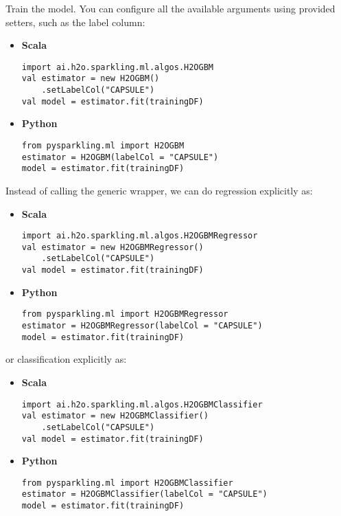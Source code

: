 \documentclass{standalone}
\begin{document}
	Train the model. You can configure all the available arguments using provided setters, such as the label column:

	\begin{itemize}
		\item \textbf{Scala} \begin{lstlisting}[style=Scala]
import ai.h2o.sparkling.ml.algos.H2OGBM
val estimator = new H2OGBM()
	.setLabelCol("CAPSULE")
val model = estimator.fit(trainingDF)
		\end{lstlisting}
		\item \textbf{Python} \begin{lstlisting}[style=Python]
from pysparkling.ml import H2OGBM
estimator = H2OGBM(labelCol = "CAPSULE")
model = estimator.fit(trainingDF)
		\end{lstlisting}
	\end{itemize}

	Instead of calling the generic wrapper, we can do regression explicitly as:

	\begin{itemize}
		\item \textbf{Scala} \begin{lstlisting}[style=Scala]
import ai.h2o.sparkling.ml.algos.H2OGBMRegressor
val estimator = new H2OGBMRegressor()
	.setLabelCol("CAPSULE")
val model = estimator.fit(trainingDF)
		\end{lstlisting}
		\item \textbf{Python} \begin{lstlisting}[style=Python]
from pysparkling.ml import H2OGBMRegressor
estimator = H2OGBMRegressor(labelCol = "CAPSULE")
model = estimator.fit(trainingDF)
		\end{lstlisting}
	\end{itemize}

	or classification explicitly as:

	\begin{itemize}
		\item \textbf{Scala} \begin{lstlisting}[style=Scala]
import ai.h2o.sparkling.ml.algos.H2OGBMClassifier
val estimator = new H2OGBMClassifier()
	.setLabelCol("CAPSULE")
val model = estimator.fit(trainingDF)
		\end{lstlisting}
		\item \textbf{Python} \begin{lstlisting}[style=Python]
from pysparkling.ml import H2OGBMClassifier
estimator = H2OGBMClassifier(labelCol = "CAPSULE")
model = estimator.fit(trainingDF)
		\end{lstlisting}
	\end{itemize}
\end{document}
